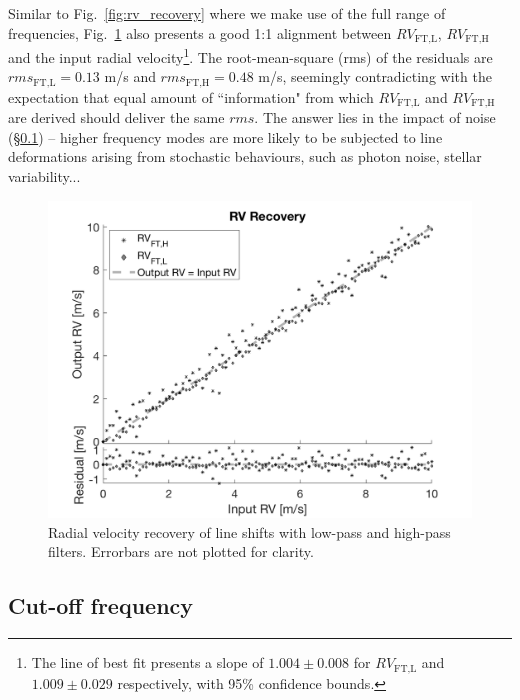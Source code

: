 Similar to Fig.~\ref{fig:rv_recovery} where we make use of the full range of frequencies, Fig.~\ref{fig:rv_recovery_LH} also presents a good 1:1 alignment between $RV_\text{FT,L}$, $RV_\text{FT,H}$ and the input radial velocity\footnote{The line of best fit presents a slope of $1.004\pm0.008$ for $RV_\text{FT,L}$ and $1.009\pm0.029$ respectively, with 95\% confidence bounds.}. The root-mean-square (rms) of the residuals are $rms_\text{FT,L} = 0.13$ m/s and $rms_\text{FT,H} = 0.48$ m/s, seemingly contradicting with the expectation that equal amount of ``information" from which $RV_\text{FT,L}$ and $RV_\text{FT,H}$ are derived should deliver the same $rms$. The answer lies in the impact of noise (\S\ref{sec:noise}) -- higher frequency modes are more likely to be subjected to line deformations arising from stochastic behaviours, such as photon noise, stellar variability...

\begin{figure}[tbp]
\centering
\includegraphics[width = 0.7 \linewidth]
{./Figures/Methods/5-LINE_SHIFT_ONLY-HL.png}
\caption[Low-pass and high-pass radial velocities]
{Radial velocity recovery of line shifts with low-pass and high-pass filters. Errorbars are not plotted for clarity.}
\label{fig:rv_recovery_LH}
\end{figure} 
\FloatBarrier

\subsection{Cut-off frequency}
\label{sec:noise}

